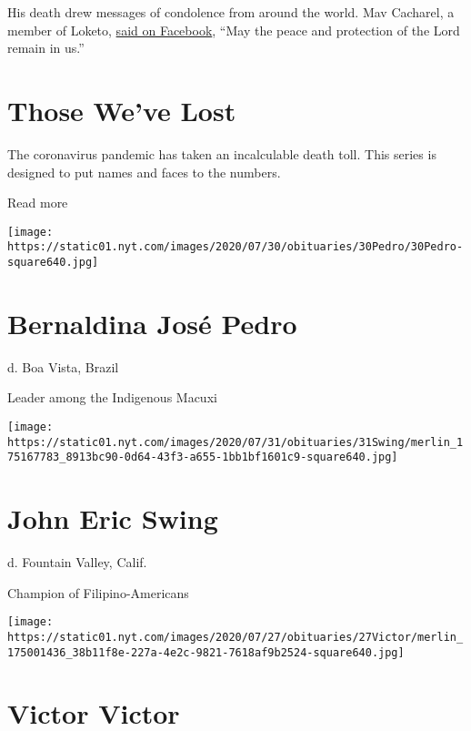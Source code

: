 His death drew messages of condolence from around the world. Mav
Cacharel, a member of Loketo,
\href{https://www.facebook.com/mavcacharel.fr/posts/3200452843298452?_rdc=1\&_rdr}{said
on Facebook}, ``May the peace and protection of the Lord remain in us.''

\href{https://www.nytimes.com/interactive/2020/obituaries/people-died-coronavirus-obituaries.html?action=click\&pgtype=Article\&state=default\&region=BELOW_MAIN_CONTENT\&context=covid_obits_promo}{}

\hypertarget{those-weve-lost}{%
\section{Those We've Lost}\label{those-weve-lost}}

The coronavirus pandemic has taken an incalculable death toll. This
series is designed to put names and faces to the numbers.

Read more

\texttt{[image: https://static01.nyt.com/images/2020/07/30/obituaries/30Pedro/30Pedro-square640.jpg]}

\hypertarget{bernaldina-josuxe9-pedro}{%
\section{Bernaldina José Pedro}\label{bernaldina-josuxe9-pedro}}

d. Boa Vista, Brazil

Leader among the Indigenous Macuxi

\texttt{[image: https://static01.nyt.com/images/2020/07/31/obituaries/31Swing/merlin\_175167783\_8913bc90-0d64-43f3-a655-1bb1bf1601c9-square640.jpg]}

\hypertarget{john-eric-swing}{%
\section{John Eric Swing}\label{john-eric-swing}}

d. Fountain Valley, Calif.

Champion of Filipino-Americans

\texttt{[image: https://static01.nyt.com/images/2020/07/27/obituaries/27Victor/merlin\_175001436\_38b11f8e-227a-4e2c-9821-7618af9b2524-square640.jpg]}

\hypertarget{victor-victor}{%
\section{Victor Victor}\label{victor-victor}}

